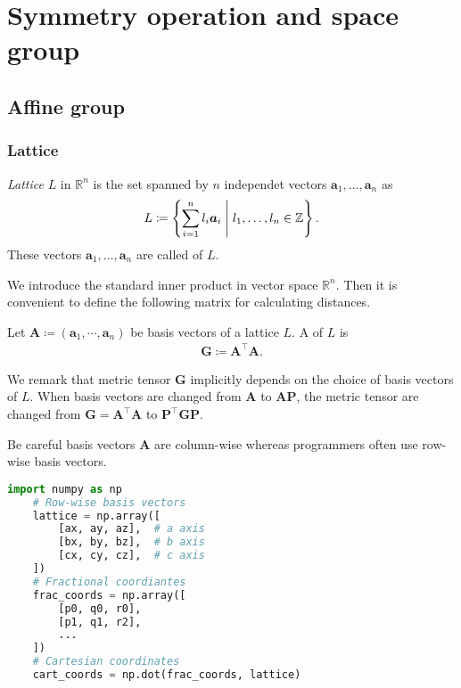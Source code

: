 \section{\label{sec:operation}Symmetry operation and space group}

\subsection{Affine group}

\subsubsection{Lattice}

\begin{screen}
  \begin{definition}[lattice]
    \textit{Lattice} $L$ in $\mathbb{R}^{n}$ is the set spanned by $n$ independet vectors $\bm{a}_{1}, \dots, \bm{a}_{n}$ as
    \begin{align}
      L \coloneqq \left\{  \sum_{i=1}^{n} l_{i} \bm{a}_{i}  \mathrel{}\middle|\mathrel{}  l_{1}, \dots, l_{n} \in \mathbb{Z}  \right\}.
    \end{align}
    These vectors $\bm{a}_{1}, \dots, \bm{a}_{n}$ are called  of $L$.
  \end{definition}
\end{screen}

We introduce the standard inner product in vector space $\mathbb{R}^{n}$.
Then it is convenient to define the following matrix for calculating distances.

\begin{screen}
  \begin{definition}
    Let $\mathbf{A} \coloneqq ( \mathbf{a}_{1}, \cdots, \mathbf{a}_{n} )$ be basis vectors of a lattice $L$.
    A  of $L$ is
    \begin{align}
      \bm{G} \coloneqq \bm{A}^{\top} \bm{A}.
    \end{align}
  \end{definition}
\end{screen}

We remark that metric tensor $\bm{G}$ implicitly depends on the choice of basis vectors of $L$.
When basis vectors are changed from $\bm{A}$ to $\bm{AP}$, the metric tensor are changed from $ \bm{G} = \bm{A}^{\top} \bm{A}$ to $\bm{P}^{\top} \bm{GP}$.

Be careful basis vectors $\bm{A}$ are column-wise whereas programmers often use row-wise basis vectors.
\begin{lstlisting}[language=Python]
    import numpy as np
    # Row-wise basis vectors
    lattice = np.array([
        [ax, ay, az],  # a axis
        [bx, by, bz],  # b axis
        [cx, cy, cz],  # c axis
    ])
    # Fractional coordiantes
    frac_coords = np.array([
        [p0, q0, r0],
        [p1, q1, r2],
        ...
    ])
    # Cartesian coordinates
    cart_coords = np.dot(frac_coords, lattice)
\end{lstlisting}

